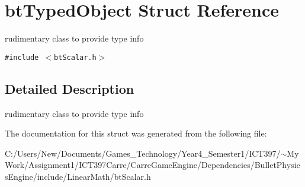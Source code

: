 \hypertarget{structbt_typed_object}{
\section{btTypedObject Struct Reference}
\label{structbt_typed_object}
}
rudimentary class to provide type info  


{\tt \#include $<$btScalar.h$>$}



\subsection{Detailed Description}
rudimentary class to provide type info 

The documentation for this struct was generated from the following file:\begin{CompactItemize}
\item 
C:/Users/New/Documents/Games\_\-Technology/Year4\_\-Semester1/ICT397/$\sim$My Work/Assignment1/ICT397Carre/CarreGameEngine/Dependencies/BulletPhysicsEngine/include/LinearMath/btScalar.h\end{CompactItemize}
